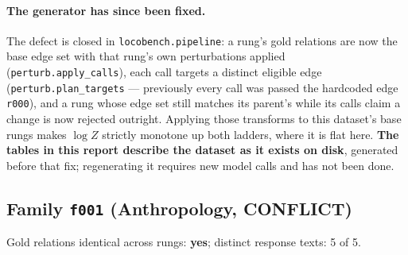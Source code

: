 \documentclass[11pt]{article}
\begin{document}
\paragraph{The generator has since been fixed.} The defect is closed in \texttt{locobench.pipeline}: a rung's gold relations are now the base edge set with that rung's own perturbations applied (\texttt{perturb.apply\_calls}), each call targets a distinct eligible edge (\texttt{perturb.plan\_targets} --- previously every call was passed the hardcoded edge \texttt{r000}), and a rung whose edge set still matches its parent's while its calls claim a change is now rejected outright. Applying those transforms to this dataset's base rungs makes $\log Z$ strictly monotone up both ladders, where it is flat here. \textbf{The tables in this report describe the dataset as it exists on disk}, generated before that fix; regenerating it requires new model calls and has not been done.

\subsection*{Family \texttt{f001} (Anthropology, CONFLICT)}

Gold relations identical across rungs: \textbf{yes}; distinct response texts: 5 of 5.
\end{document}
